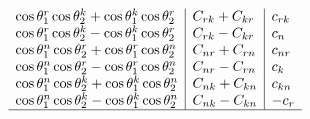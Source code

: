 \begin{table}[htb]
\begin{center}
\begin{adjustbox}{scale=0.85,center}
\begin{math}
\begin{array}{l|l|l}
\cos \theta_1^r \cos \theta_2^k+\cos \theta_1^k \cos \theta_2^r & C_{r k}+C_{k r} & c_{r k} \\
\cos \theta_1^r \cos \theta_2^k-\cos \theta_1^k \cos \theta_2^r & C_{r k}-C_{k r} & c_n \\
\cos \theta_1^n \cos \theta_2^r+\cos \theta_1^r \cos \theta_2^n & C_{n r}+C_{r n} & c_{n r} \\
\cos \theta_1^n \cos \theta_2^r-\cos \theta_1^r \cos \theta_2^n & C_{n r}-C_{r n} & c_k \\
\cos \theta_1^n \cos \theta_2^k+\cos \theta_1^k \cos \theta_2^n & C_{n k}+C_{k n} & c_{k n} \\
\cos \theta_1^n \cos \theta_2^k-\cos \theta_1^k \cos \theta_2^n & C_{n k}-C_{k n} & -c_r \\
\hline 

\end{array}
\end{math}
\end{adjustbox}
\end{center}
\end{table}
